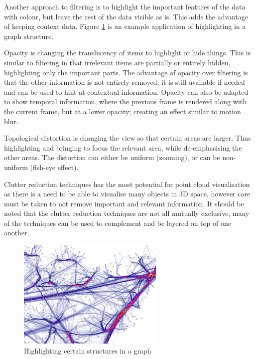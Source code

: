 Another approach to filtering is to highlight the important features of the
data with colour, but leave the rest of the data visible as is. This adds the
advantage of keeping context data. Figure \ref{fig:graphhighlight} is an
example application of highlighting in a graph structure.

Opacity is changing the translucency of items to highlight or hide things. This
is similar to filtering in that irrelevant items are partially or entirely
hidden, highlighting only the important parts. The advantage of opacity over
filtering is that the other information is not entirely removed, it is still
available if needed and can be used to hint at contextual information. Opacity
can also be adapted to show temporal information, where the previous frame is
rendered along with the current frame, but at a lower opacity; creating an
effect similar to motion blur.

Topological distortion is changing the view so that certain areas are larger.
Thus highlighting and bringing to focus the relevant area, while de-emphasising
the other areas. The distortion can either be uniform (zooming), or can be
non-uniform (fish-eye effect).

Clutter reduction techniques has the most potential for point cloud
visualisation as there is a need to be able to visualise many objects in 3D
space, however care must be taken to not remove important and relevant
information. It should be noted that the clutter reduction techniques are not
all mutually exclusive, many of the techniques can be used to complement and be
layered on top of one another.

\begin{figure}[h!]
  \begin{center}
    \includegraphics[width=70mm]{graph_highlight}
  \end{center}
  \caption{Highlighting certain structures in a graph}
  \label{fig:graphhighlight}
\end{figure}


